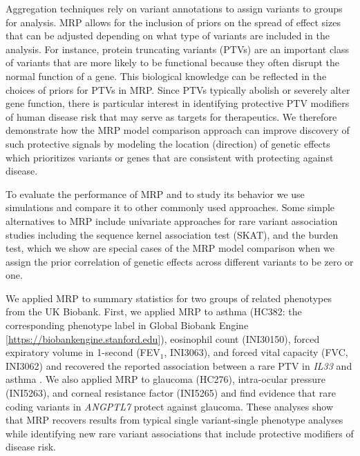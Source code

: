 Aggregation techniques rely on variant annotations to assign variants to groups for analysis. MRP allows for the inclusion of priors on the spread of effect sizes that can be adjusted depending on what type of variants are included in the analysis. For instance, protein truncating variants (PTVs)\cite{rivas2013assessing,rivas2015effect} are an important class of variants that are more likely to be functional because they often disrupt the normal function of a gene. This biological knowledge can be reflected in the choices of priors for PTVs in MRP. Since PTVs typically abolish or severely alter gene function, there is particular interest in identifying protective PTV modifiers of human disease risk that may serve as targets for therapeutics\cite{pcsk9,cohen2006sequence,sullivan2012effect}. We therefore demonstrate how the MRP model comparison approach can improve discovery of such protective signals by modeling the location (direction) of genetic effects which prioritizes variants or genes that are consistent with protecting against disease. 

To evaluate the performance of MRP and to study its behavior we use simulations and compare it to other commonly used approaches. Some simple alternatives to MRP include univariate approaches for rare variant association studies including the sequence kernel association test (SKAT)\cite{skat}, and the burden test, which we show are special cases of the MRP model comparison when we assign the prior correlation of genetic effects across different variants to be zero or one. 
  
We applied MRP to summary statistics for two groups of related phenotypes from the UK Biobank. First, we applied MRP to asthma (HC382: the corresponding phenotype label in Global Biobank Engine [\url{https://biobankengine.stanford.edu}]), eosinophil count (INI30150), forced expiratory volume in 1-second (FEV$_1$, INI3063), and forced vital capacity (FVC, INI3062) and recovered the reported association between a rare PTV in \textit{IL33} and asthma \cite{DeBoever179762, 10.1371/journal.pgen.1006659}. We also applied MRP to glaucoma (HC276), intra-ocular pressure (INI5263), and corneal resistance factor (INI5265) and find evidence that rare coding variants in \textit{ANGPTL7} protect against glaucoma. These analyses show that MRP recovers results from typical single variant-single phenotype analyses while identifying new rare variant associations that include protective modifiers of disease risk.

